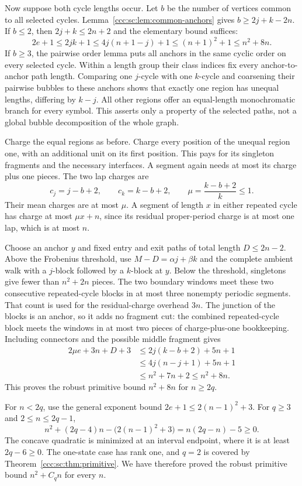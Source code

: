 \documentclass[11pt,letterpaper]{article}
\theoremstyle{definition}
\theoremstyle{remark}
\begin{document}
Now suppose both cycle lengths occur. Let $b$ be the number of vertices common to all selected cycles. Lemma~\ref{ccc:sc:lem:common-anchors} gives $b\ge2j+k-2n$. If $b\le2$, then $2j+k\le2n+2$ and the elementary bound suffices:
\[
 2e+1\le2jk+1\le4j(n+1-j)+1\le(n+1)^2+1\le n^2+8n.
\]
If $b\ge3$, the pairwise order lemma puts all anchors in the same cyclic order on every selected cycle. Within a length group their class indices fix every anchor-to-anchor path length. Comparing one $j$-cycle with one $k$-cycle and coarsening their pairwise bubbles to these anchors shows that exactly one region has unequal lengths, differing by $k-j$. All other regions offer an equal-length monochromatic branch for every symbol. This asserts only a property of the selected paths, not a global bubble decomposition of the whole graph.

Charge the equal regions as before. Charge every position of the unequal region one, with an additional unit on its first position. This pays for its singleton fragments and the necessary interfaces. A segment again needs at most its charge plus one pieces. The two lap charges are
\[
 c_j=j-b+2,\qquad c_k=k-b+2,
 \qquad \mu=\frac{k-b+2}{k}\le1.
\]
Their mean charges are at most $\mu$. A segment of length $x$ in either repeated cycle has charge at most $\mu x+n$, since its residual proper-period charge is at most one lap, which is at most $n$.

Choose an anchor $y$ and fixed entry and exit paths of total length $D\le2n-2$. Above the Frobenius threshold, use $M-D=\alpha j+\beta k$ and the complete ambient walk with a $j$-block followed by a $k$-block at $y$. Below the threshold, singletons give fewer than $n^2+2n$ pieces. The two boundary windows meet these two consecutive repeated-cycle blocks in at most three nonempty periodic segments. That count is used for the residual-charge overhead $3n$. The junction of the blocks is an anchor, so it adds no fragment cut: the combined repeated-cycle block meets the windows in at most two pieces of charge-plus-one bookkeeping. Including connectors and the possible middle fragment gives
\begin{align*}
 2\mu e+3n+D+3
 &\le2j(k-b+2)+5n+1\\
 &\le4j(n-j+1)+5n+1\\
 &\le n^2+7n+2\le n^2+8n.
\end{align*}
This proves the robust primitive bound $n^2+8n$ for $n\ge2q$.

For $n<2q$, use the general exponent bound $2e+1\le2(n-1)^2+3$. For $q\ge3$ and $2\le n\le2q-1$,
\[
 n^2+(2q-4)n-\bigl(2(n-1)^2+3\bigr)=n(2q-n)-5\ge0.
\]
The concave quadratic is minimized at an interval endpoint, where it is at least $2q-6\ge0$. The one-state case has rank one, and $q=2$ is covered by Theorem~\ref{ccc:sc:thm:primitive}. We have therefore proved the robust primitive bound $n^2+C_qn$ for every $n$.
\end{document}
